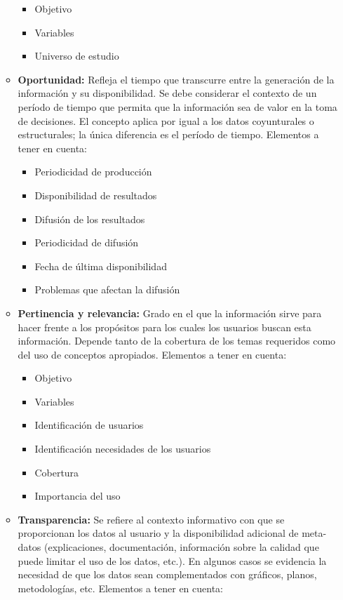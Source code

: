 \documentclass[
]{book}
\providecommand{\tightlist}{%
  \setlength{\itemsep}{0pt}\setlength{\parskip}{0pt}}
\begin{document}
\begin{itemize}
\begin{itemize}
    \begin{itemize}
    \tightlist
    \item
      Objetivo
    \item
      Variables
    \item
      Universo de estudio
    \end{itemize}
  \item
    \textbf{Oportunidad:}
    Refleja el tiempo que transcurre entre la generación de la información y su disponibilidad. Se debe
    considerar el contexto de un período de tiempo que permita que la información sea de valor en la
    toma de decisiones. El concepto aplica por igual a los datos coyunturales o estructurales; la única
    diferencia es el período de tiempo.
    Elementos a tener en cuenta:

    \begin{itemize}
    \tightlist
    \item
      Periodicidad de producción
    \item
      Disponibilidad de resultados
    \item
      Difusión de los resultados
    \item
      Periodicidad de difusión
    \item
      Fecha de última disponibilidad
    \item
      Problemas que afectan la difusión
    \end{itemize}
  \item
    \textbf{Pertinencia y relevancia:}
    Grado en el que la información sirve para hacer frente a los propósitos para los cuales los usuarios
    buscan esta información. Depende tanto de la cobertura de los temas requeridos como del uso de
    conceptos apropiados.
    Elementos a tener en cuenta:

    \begin{itemize}
    \tightlist
    \item
      Objetivo
    \item
      Variables
    \item
      Identificación de usuarios
    \item
      Identificación necesidades de los usuarios
    \item
      Cobertura
    \item
      Importancia del uso
    \end{itemize}
  \item
    \textbf{Transparencia:}
    Se refiere al contexto informativo con que se proporcionan los datos al usuario y la disponibilidad
    adicional de meta-datos (explicaciones, documentación, información sobre la calidad que puede
    limitar el uso de los datos, etc.). En algunos casos se evidencia la necesidad de que los datos sean
    complementados con gráficos, planos, metodologías, etc.
    Elementos a tener en cuenta:


\end{itemize}
\end{itemize}
\end{document}
